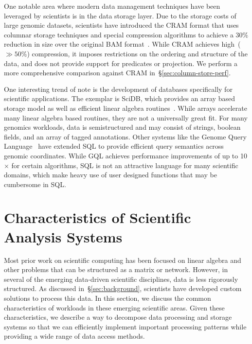 \documentclass{acm_proc_article-sp}
\begin{document}
One notable area where modern data management techniques have been leveraged by scientists is in
the data storage layer. Due to the storage costs of large genomic datasets, scientists have introduced the
CRAM format that uses columnar storage techniques and special compression algorithms to achieve a
30\% reduction in size over the original BAM format~\cite{fritz11}. While CRAM achieves high~($\gg 50\%$)
compression, it imposes restrictions on the ordering and structure of the data, and does not provide
support for predicates or projection. We perform a more comprehensive comparison against CRAM
in~\S\ref{sec:column-store-perf}.

One interesting trend of note is the development of databases specifically for scientific applications.
The exemplar is \linebreak SciDB, which provides an array based storage model as well as efficient
linear algebra routines~\cite{brown10}. While arrays accelerate many linear algebra based routines, they
are not a universally great fit. For many genomics workloads, data is semistructured and may consist of
strings, boolean fields, and an array of tagged annotations. Other systems like the Genome Query
Language~\cite{kozanitis14} have extended SQL to provide efficient query semantics across genomic
coordinates. While GQL achieves performance improvements of up to 10$\times$ for certain algorithms,
SQL is not an attractive language for many scientific domains, which make heavy use of user designed
functions that may be cumbersome in SQL.

\section{Characteristics of Scientific \\ Analysis Systems}
\label{sec:principles}

Most prior work on scientific computing has been focused on linear algebra and other problems that can
be structured as a matrix or network. However, in several of the emerging data-driven scientific
disciplines, data is less rigorously structured. As discussed in~\S\ref{sec:background}, scientists have
developed custom solutions to process this data. In this
section, we discuss the common characteristics of workloads in these emerging scientific areas. Given
these characteristics, we describe a way to decompose data processing and storage systems so that
we can efficiently implement important processing patterns while providing a wide range of data access
methods.
\end{document}
